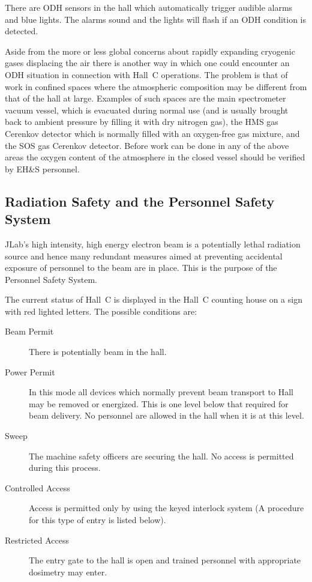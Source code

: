 {There are ODH sensors in the hall which automatically trigger audible
alarms and blue lights. The alarms sound and the lights will flash if
an ODH condition is detected.

Aside from the more or less global concerns about rapidly expanding
cryogenic gases displacing the air there is another
way in which one could encounter an ODH situation in connection with Hall~C
operations. The problem is that of work in confined spaces where
the atmospheric composition may be different from that of the hall at
large. Examples of such spaces are the main spectrometer vacuum vessel,
which is evacuated during normal use (and is usually brought back to ambient
pressure by filling it with dry nitrogen gas), the HMS gas Cerenkov detector
which is normally filled with an oxygen-free gas mixture, and the
SOS gas Cerenkov detector. Before work can be done in any of the
above areas the oxygen content of the atmosphere in the closed vessel should
be verified by EH\&S personnel.

\subsection{Radiation Safety and the Personnel Safety System }

JLab's high intensity, high energy electron beam is a potentially lethal
radiation source and hence many redundant measures
aimed at preventing accidental exposure of personnel to the beam are in place.
This is the purpose of the Personnel Safety System.

The current status of Hall~C is displayed in the Hall~C counting house
on a sign with red lighted letters. The possible conditions are:
\begin{description}
\item[Beam Permit] There is potentially beam in the hall.
\item[Power Permit] In this mode all devices which normally prevent beam 
transport to Hall may be removed or energized.  This is one level below 
that required for beam delivery.
No personnel are allowed in the hall when it is at this level.
\item[Sweep] The machine safety officers are securing the hall.
No access is permitted during this process.
\item[Controlled Access] Access is permitted only by using the keyed
interlock system (A procedure for this type of entry is listed below).
\item[Restricted Access] The entry gate to the hall is open and trained
personnel with appropriate dosimetry may enter.
\end{description}

}

